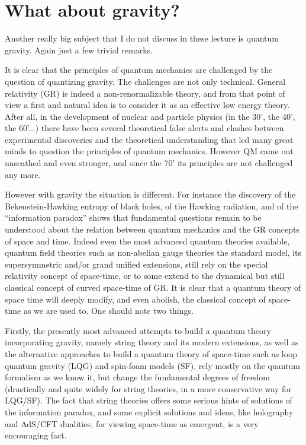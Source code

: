 \section{What about gravity?}
Another really big subject that I do not discuss in these lecture is quantum gravity. Again just a few trivial remarks.

It is clear that the principles of quantum mechanics are challenged by the question of quantizing gravity. 
The challenges are not only technical. General relativity (GR) is indeed a non-renormalizable theory, and from that point of view a first and natural idea is to consider it as an effective low energy theory. After all, in the development of nuclear and particle physics (in the 30', the 40', the 60'...)  there have been several theoretical false alerts and clashes between experimental discoveries and the theoretical understanding that led many great minds to question the principles of quantum mechanics. However QM came out unscathed and even stronger, and since the 70' its principles are not challenged any more.

However with gravity the situation is different.  For instance the discovery of the Bekenstein-Hawking entropy of black holes, of the Hawking radiation, and of the ``information paradox'' shows that  fundamental questions remain to be understood about the relation between  quantum mechanics and the GR concepts of space and time. Indeed even the most advanced quantum theories available, quantum field theories such as non-abelian gauge theories
the standard model, its supersymmetric and/or grand unified extensions, still rely on the special relativity concept of space-time, or to some extend to the dynamical but still classical concept of curved space-time of GR.
It is clear that a quantum theory of space time will deeply modify, and even abolish, the classical concept of space-time as we are used to.
One should note two things. 

Firstly, the presently most advanced attempts to build a quantum theory incorporating gravity, namely string theory and its modern extensions, as well as the alternative approaches to build a quantum theory of space-time such as loop quantum gravity (LQG) and spin-foam models (SF), rely mostly on the quantum formalism as we know it, but change the fundamental degrees of freedom (drastically and quite widely for string theories, in a more conservative way for LQG/SF).
The fact that  string theories offers some serious hints of solutions of the information paradox, and some explicit solutions and ideas, like holography and AdS/CFT dualities, for viewing space-time as emergent, is a very encouraging fact.

